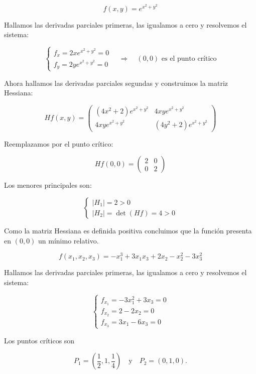 \begin{Ejer}

\[
f(x,y)=e^{x^2+y^2}
\]

Hallamos las derivadas parciales primeras, las igualamos a cero y resolvemos el sistema:

\[
\begin{cases}
f_x = 2xe^{x^2+y^2}=0\\
f_y = 2ye^{x^2+y^2}=0
\end{cases}
\quad \Longrightarrow \quad (0,0) \text{ es el punto crítico}
\]

Ahora hallamos las derivadas parciales segundas y construimos la matriz Hessiana:

\[
Hf(x,y)=
\begin{pmatrix}
(4x^2+2)e^{x^2+y^2} & 4xye^{x^2+y^2}\\
4xye^{x^2+y^2} & (4y^2+2)e^{x^2+y^2}
\end{pmatrix}
\]

Reemplazamos por el punto crítico:

\[
Hf(0,0)=
\begin{pmatrix}
2 & 0\\
0 & 2
\end{pmatrix}
\]

Los menores principales son:

\[
\begin{cases}
|H_1|=2>0\\
|H_2|=\det(Hf)=4>0
\end{cases}
\]

Como la matriz Hessiana es definida positiva concluimos que la función presenta en 
$(0,0)$ un mínimo relativo.
\end{Ejer}

\begin{Ejer}

\[
f(x_1,x_2,x_3)= -x_1^3 + 3x_1x_3 + 2x_2 - x_2^2 - 3x_3^2
\]

Hallamos las derivadas parciales primeras, las igualamos a cero y resolvemos el sistema:

\[
\begin{cases}
f_{x_1} = -3x_1^2 + 3x_3 = 0\\
f_{x_2} = 2 - 2x_2 = 0\\
f_{x_3} = 3x_1 - 6x_3 = 0
\end{cases}
\]

Los puntos críticos son

\[
P_1=\left(\frac{1}{2},1,\frac{1}{4}\right)
\quad \text{y} \quad
P_2=(0,1,0).
\]
\end{Ejer}


